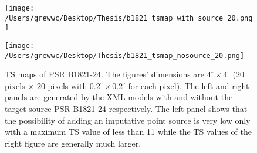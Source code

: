 \documentclass[12pt]{report}
\begin{document}
            \begin{figure}[!ht]
              \begin{center}
              \begin{minipage}{0.46\textwidth}
                \begin{center} 
                  \texttt{[image: /Users/grewwc/Desktop/Thesis/b1821\_tsmap\_with\_source\_20.png]}
                \end{center}
              \end{minipage}
              \begin{minipage}{0.45\textwidth}
                \begin{center}
                  \texttt{[image: /Users/grewwc/Desktop/Thesis/b1821\_tsmap\_nosource\_20.png]}
                \end{center}
              \end{minipage}
            \end{center}
              \caption{TS maps of PSR B1821-24. The figures' dimensions are $4^{\circ} \times4^{\circ}$ 
              ($20$ pixels $\times$ $20$ pixels with $0.2^{\circ} \times 0.2^{\circ}$ for each pixel). 
              The left and right panels are generated by the XML models with and without the 
              target source PSR B1821-24 respectively. The left panel shows that the possibility 
              of adding an imputative point source is very low only with a maximum TS value of 
              less than 11 while the TS values of the right figure are generally much larger.}
                \label{fig: b1821_tsmap_comparison_20}
            \end{figure}
            \vspace{1cm}
            
\end{document}
